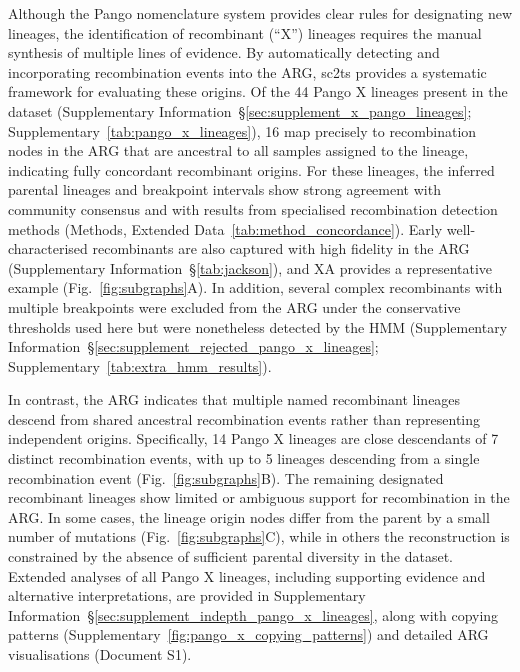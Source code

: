 \documentclass[12pt]{article}
\newcommand{\supref}[1]{Supplementary Information~\S\ref{#1}}
\newcommand{\figref}[1]{Fig.~\ref{#1}}
\newcommand{\edref}[1]{Extended Data~\ref{#1}}
\newcommand{\siref}[1]{Supplementary~\ref{#1}}
\begin{document}
Although the Pango nomenclature system\cite{Rambaut2020} provides clear
rules for designating new lineages, the identification of
recombinant (``X'') lineages requires the manual synthesis
of multiple lines of evidence\cite{Smith2023tracking}.
By automatically detecting and incorporating recombination events into the ARG,
sc2ts provides a systematic framework for evaluating these origins.
Of the 44 Pango X lineages present in the dataset
(\supref{sec:supplement_x_pango_lineages};
\siref{tab:pango_x_lineages}),
16 map precisely to
recombination nodes in the ARG that are ancestral to all samples assigned to
the lineage, indicating fully concordant recombinant origins.
For these
lineages, the inferred parental lineages and breakpoint intervals show strong
agreement with community consensus and with results from specialised
recombination detection methods
(Methods, \edref{tab:method_concordance}).
Early well-characterised recombinants\cite{Jackson2021} are also captured
with high fidelity in the ARG
(\supref{tab:jackson}),
and XA provides a representative example (\figref{fig:subgraphs}A).
In addition, several complex recombinants with multiple
breakpoints were excluded from the ARG under the conservative thresholds used
here but were nonetheless detected by the HMM
(\supref{sec:supplement_rejected_pango_x_lineages};
\siref{tab:extra_hmm_results}).

In contrast, the ARG indicates that multiple named recombinant lineages descend
from shared ancestral recombination events rather than representing independent
origins.
Specifically, 14 Pango X lineages are close descendants of 7 distinct
recombination events, with up to 5 lineages descending from a
single recombination event (\figref{fig:subgraphs}B).
The remaining designated recombinant lineages show limited or ambiguous support for
recombination in the ARG. In some cases, the lineage origin nodes differ from the
parent by a small number of mutations (\figref{fig:subgraphs}C),
while in others
the reconstruction is constrained by the absence of sufficient parental
diversity in the dataset. Extended analyses of all Pango X lineages, including
supporting evidence and alternative interpretations, are provided in
\supref{sec:supplement_indepth_pango_x_lineages},
along with copying patterns (\siref{fig:pango_x_copying_patterns})
and detailed ARG visualisations (Document S1).
\end{document}
